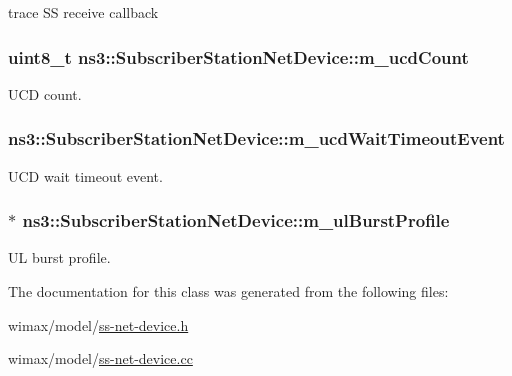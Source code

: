 trace SS receive callback 

\subsubsection[{\texorpdfstring{m\+\_\+ucd\+Count}{m_ucdCount}}]{\setlength{\rightskip}{0pt plus 5cm}uint8\+\_\+t ns3\+::\+Subscriber\+Station\+Net\+Device\+::m\+\_\+ucd\+Count\hspace{0.3cm}{\ttfamily [private]}}\hypertarget{classns3_1_1SubscriberStationNetDevice_a0adf7470dd476619c9c5298bb52e9a32}{}\label{classns3_1_1SubscriberStationNetDevice_a0adf7470dd476619c9c5298bb52e9a32}


U\+CD count. 

\subsubsection[{\texorpdfstring{m\+\_\+ucd\+Wait\+Timeout\+Event}{m_ucdWaitTimeoutEvent}}]{ ns3\+::\+Subscriber\+Station\+Net\+Device\+::m\+\_\+ucd\+Wait\+Timeout\+Event\hspace{0.3cm}{\ttfamily [private]}}\hypertarget{classns3_1_1SubscriberStationNetDevice_a851bc1fe752fe52544c8efdc7ac0e20a}{}\label{classns3_1_1SubscriberStationNetDevice_a851bc1fe752fe52544c8efdc7ac0e20a}


U\+CD wait timeout event. 

\subsubsection[{\texorpdfstring{m\+\_\+ul\+Burst\+Profile}{m_ulBurstProfile}}]{$\ast$ ns3\+::\+Subscriber\+Station\+Net\+Device\+::m\+\_\+ul\+Burst\+Profile\hspace{0.3cm}{\ttfamily [private]}}\hypertarget{classns3_1_1SubscriberStationNetDevice_a354cbcbc741bf7413d168af01c3cf353}{}\label{classns3_1_1SubscriberStationNetDevice_a354cbcbc741bf7413d168af01c3cf353}


UL burst profile. 



The documentation for this class was generated from the following files\+:\begin{DoxyCompactItemize}
\item 
wimax/model/\hyperlink{ss-net-device_8h}{ss-\/net-\/device.\+h}\item 
wimax/model/\hyperlink{ss-net-device_8cc}{ss-\/net-\/device.\+cc}\end{DoxyCompactItemize}
